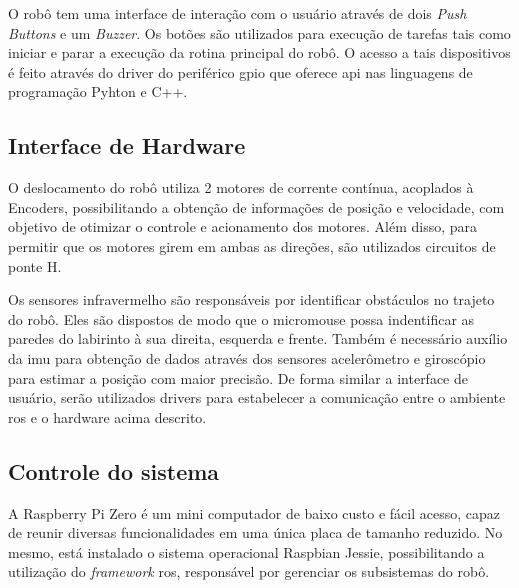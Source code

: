 O robô tem uma interface de interação com o usuário através de dois \textit{Push Buttons} e um \textit{Buzzer}. Os botões são utilizados para execução de tarefas tais como iniciar  e parar a execução da rotina principal do robô. O acesso a tais dispositivos é feito através do driver do periférico \gls*{gpio} que oferece \gls*{api} nas linguagens de programação Pyhton e C++.

\subsection{Interface de Hardware}
\label{ssec:interface_de_hardware}
O deslocamento do robô utiliza 2 motores de corrente contínua, acoplados à Encoders, possibilitando a obtenção de informações de posição e velocidade, com objetivo de otimizar o controle e acionamento dos motores. Além disso, para permitir que os motores girem em ambas as direções, são utilizados circuitos de ponte H.
 
Os sensores infravermelho são responsáveis por identificar obstáculos no trajeto do robô. Eles são dispostos de modo que o micromouse possa indentificar as paredes do labirinto à sua direita, esquerda e frente. Também é necessário auxílio da \gls*{imu} para obtenção de dados através dos sensores acelerômetro e giroscópio para estimar a posição com maior precisão. De forma similar a interface de usuário, serão utilizados drivers para estabelecer a comunicação entre o ambiente \gls*{ros} e o hardware acima descrito.

\subsection{Controle do sistema}
\label{ssec:controle_do_sistema}
A Raspberry Pi Zero é um mini computador de baixo custo e fácil acesso, capaz de reunir diversas funcionalidades em uma única placa de tamanho reduzido.  No mesmo, está instalado o sistema operacional Raspbian Jessie, possibilitando a utilização do \textit{framework} \gls*{ros}, responsável por gerenciar os subsistemas do robô.

